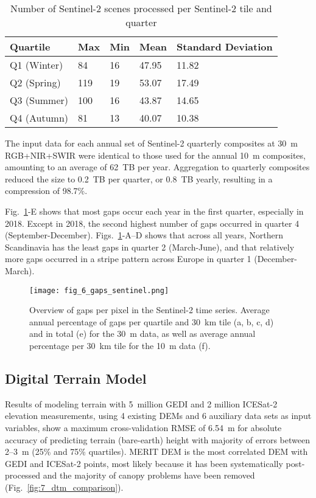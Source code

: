 \begin{table}[!hbt]
\centering
\caption{Number of Sentinel-2 scenes processed per Sentinel-2 tile and quarter}
\label{tab:s2_scenes}
\begin{tabular}{@{}lllll@{}}
\hline
Quartile & Max & Min & Mean & Standard Deviation \\ 
\hline
Q1 (Winter) & 84 & 16 & 47.95 & 11.82 \\
Q2 (Spring) & 119 & 19 & 53.07 & 17.49 \\
Q3 (Summer) & 100 & 16 & 43.87 & 14.65 \\
Q4 (Autumn) & 81 & 13 & 40.07 & 10.38 \\
\hline
\end{tabular}
\end{table}

The input data for each annual set of Sentinel-2 quarterly composites at 30~m RGB+NIR+SWIR were identical to those used for the annual 10~m composites, amounting to an average of 62~TB per year. Aggregation to quarterly composites reduced the size to 0.2~TB per quarter, or 0.8~TB yearly, resulting in a compression of 98.7\%. 

Fig.\@~\ref{fig:6_gaps_sentinel}-E shows that most gaps occur each year in the first quarter, especially in 2018. Except in 2018, the second highest number of gaps occurred in quarter 4 (September-December). Figs.\@~\ref{fig:6_gaps_sentinel}-A--D shows that across all years, Northern Scandinavia has the least gaps in quarter 2 (March-June), and that relatively more gaps occurred in a stripe pattern across Europe in quarter 1 (December-March).

\begin{figure}[!hbt]
    \texttt{[image: fig\_6\_gaps\_sentinel.png]}
    \caption{Overview of gaps per pixel in the Sentinel-2 time series. Average annual percentage of gaps per quartile and 30~km tile (a, b, c, d) and in total (e) for the 30~m data, as well as average annual percentage per 30~km tile for the 10~m data (f).}
    \label{fig:6_gaps_sentinel}
\end{figure}

\subsection*{Digital Terrain Model}

Results of modeling terrain with 5~million GEDI and 2 million ICESat-2 elevation measurements, using 4 existing DEMs and 6 auxiliary data sets as input variables, show a maximum cross-validation RMSE of 6.54~m for absolute accuracy of predicting terrain (bare-earth) height with majority of errors between 2--3~m (25\% and 75\% quartiles). MERIT DEM \citep{yamazaki2019merit} is the most correlated DEM with GEDI and ICESat-2 points, most likely because it has been systematically post-processed and the majority of canopy problems have been removed (Fig.\@~\ref{fig:7_dtm_comparison}). 

